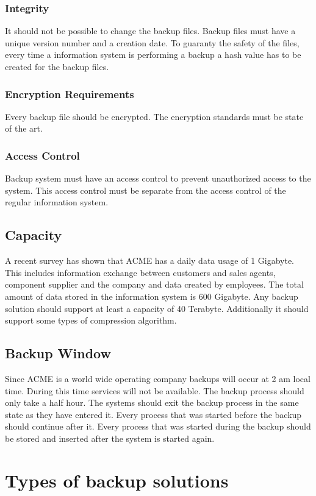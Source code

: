 \documentclass[12pt]{article}
\begin{document}
\subsubsection{Integrity}
It should not be possible to change the backup files. Backup files must have a unique version number and a creation date. To guaranty the safety of the files, every time a information system is performing a backup a hash value has to be created for the backup files.  
\subsubsection{Encryption Requirements}
Every backup file should be encrypted. The encryption standards must be state of the art.  
\subsubsection{Access Control}
Backup system must have an access control to prevent unauthorized access to the system. This access control must be separate from the access control of the regular information system.  
\subsection{Capacity}
A recent survey has shown that ACME has a daily data usage of 1 Gigabyte. This includes information exchange between customers and sales agents, component supplier and the company and data created by employees. The total amount of data stored in the information system is 600 Gigabyte. Any backup solution should support at least a capacity of 40 Terabyte. Additionally it should support some types of compression algorithm.  

\subsection{Backup Window}
Since ACME is a world wide operating company backups will occur at 2 am local time. During this time services will not be available. The backup process should only take a half hour. The systems should exit the backup process in the same state as they have entered it. Every process that was started before the backup should continue after it. Every process that was started during the backup should be stored and inserted after the system is started again.
\newpage
\section{Types of backup solutions}
\end{document}

